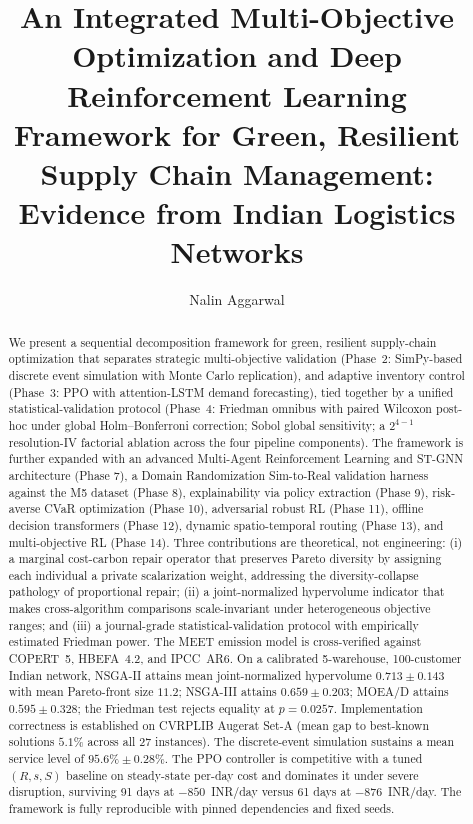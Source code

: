 \documentclass[review,preprint,authoryear,12pt]{elsarticle}
\begin{document}
\begin{frontmatter}

\title{An Integrated Multi-Objective Optimization and Deep Reinforcement
Learning Framework for Green, Resilient Supply Chain Management:
Evidence from Indian Logistics Networks}

\author[mainaff]{Nalin Aggarwal}


\address[mainaff]{Department of Industrial Engineering and Operations
Research, [Affiliation], Mumbai, India}

\begin{abstract}
We present a sequential decomposition framework for green, resilient
supply-chain optimization that separates strategic multi-objective
validation (Phase~2: SimPy-based discrete event simulation with Monte
Carlo replication), and adaptive inventory control (Phase~3: PPO with
attention-LSTM demand forecasting), tied together by a unified
statistical-validation protocol (Phase~4: Friedman omnibus with paired
Wilcoxon post-hoc under global Holm--Bonferroni correction; Sobol global
sensitivity; a $2^{4-1}$ resolution-IV factorial ablation across the
four pipeline components). The framework is further expanded with an advanced Multi-Agent Reinforcement Learning and ST-GNN architecture (Phase 7), a Domain Randomization Sim-to-Real validation harness against the M5 dataset (Phase 8), explainability via policy extraction (Phase 9), risk-averse CVaR optimization (Phase 10), adversarial robust RL (Phase 11), offline decision transformers (Phase 12), dynamic spatio-temporal routing (Phase 13), and multi-objective RL (Phase 14). Three contributions are theoretical, not engineering: (i) a marginal cost-carbon repair operator that preserves
Pareto diversity by assigning each individual a private scalarization
weight, addressing the diversity-collapse pathology of proportional
repair; (ii) a joint-normalized hypervolume indicator that makes
cross-algorithm comparisons scale-invariant under heterogeneous
objective ranges; and (iii) a journal-grade statistical-validation
protocol with empirically estimated Friedman power. The MEET emission
model is cross-verified against COPERT~5, HBEFA~4.2, and IPCC~AR6.
On a calibrated 5-warehouse, 100-customer Indian network, NSGA-II
attains mean joint-normalized hypervolume $0.713 \pm 0.143$ with mean
Pareto-front size $11.2$; NSGA-III attains $0.659 \pm 0.203$; MOEA/D
attains $0.595 \pm 0.328$; the Friedman test rejects equality at
$p = 0.0257$. Implementation correctness is established on CVRPLIB
Augerat Set-A (mean gap to best-known solutions $5.1\%$ across all 27
instances). The discrete-event simulation sustains a mean service level
of $95.6\% \pm 0.28\%$. The PPO controller is competitive with a tuned
$(R, s, S)$ baseline on steady-state per-day cost and dominates it
under severe disruption, surviving 91 days at $-850$~INR/day versus
61 days at $-876$~INR/day. The framework is fully reproducible with
pinned dependencies and fixed seeds.
\end{abstract}


\end{frontmatter}
\end{document}
